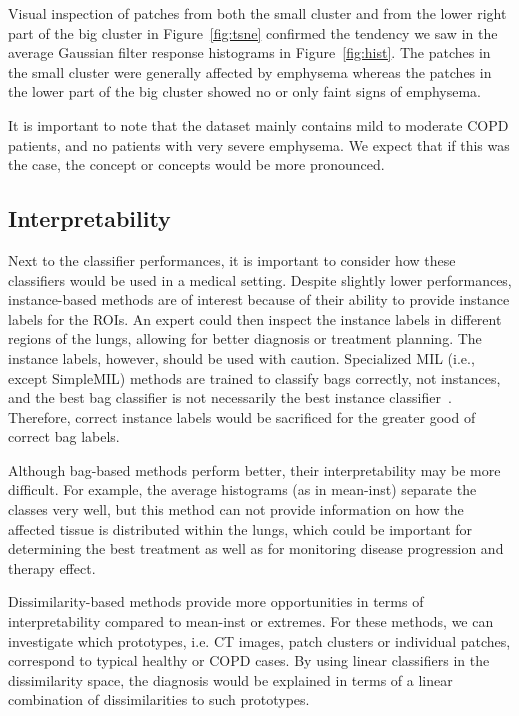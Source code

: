 \documentclass[10pt,conference,a4paper]{IEEEtran}
\begin{document}
Visual inspection of patches from both the small cluster and from the lower right part of the big cluster in Figure~\ref{fig:tsne} confirmed the tendency we saw in the average Gaussian filter response histograms in Figure~\ref{fig:hist}. The patches in the small cluster were generally affected by emphysema whereas the patches in the lower part of the big cluster showed no or only faint signs of emphysema.

It is important to note that the dataset mainly contains mild to moderate COPD patients, and no patients with very severe emphysema. We expect that if this was the case, the concept or concepts would be more pronounced.

\subsection{Interpretability}

Next to the classifier performances, it is important to consider how these classifiers would be used in a medical setting. Despite slightly lower performances, instance-based methods are of interest because of their ability to provide instance labels for the ROIs. An expert could then inspect the instance labels in different regions of the lungs, allowing for better diagnosis or treatment planning. The instance labels, however, should be used with caution. Specialized MIL (i.e., except SimpleMIL) methods are trained to classify bags correctly, not instances, and the best bag classifier is not necessarily the best instance classifier~\cite{tragante2011instance}. Therefore, correct instance labels would be sacrificed for the greater good of correct bag labels.

Although bag-based methods perform better, their interpretability may be more difficult. For example, the average
histograms (as in mean-inst) separate the classes very well, but this method can not provide information on how the
affected tissue is distributed within the lungs, which could be important for determining the best treatment as well as for monitoring disease progression and therapy effect.

Dissimilarity-based methods provide more opportunities in terms of interpretability compared to mean-inst or extremes. For these methods, we can investigate which prototypes, i.e. CT images, patch clusters or individual patches, correspond to typical healthy or COPD cases. By using linear classifiers in the dissimilarity space, the diagnosis would be explained in terms of a linear combination of dissimilarities to such prototypes.
\end{document}
